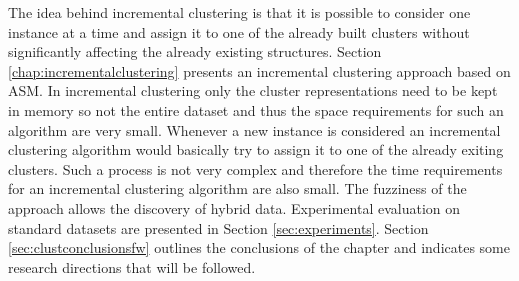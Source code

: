 The idea behind incremental clustering is that it is possible to consider one instance at a time and assign it to one of the already built clusters without significantly affecting the already existing structures. Section \ref{chap:incrementalclustering} presents an incremental clustering approach based on ASM. In incremental clustering only the cluster representations need to be kept in memory so not the entire dataset and thus the space requirements for such an algorithm are very small. Whenever a new instance is considered an incremental clustering algorithm would basically try to assign it to one of the already exiting clusters. Such a process is not very complex and therefore the time requirements for an incremental clustering algorithm are also small. The fuzziness of the approach allows the discovery of hybrid data. Experimental evaluation on standard datasets \cite{website:iris, website:wine} are presented in Section \ref{sec:experiments}. Section \ref{sec:clustconclusionsfw} outlines the conclusions of the chapter and indicates some research directions that will be followed.


